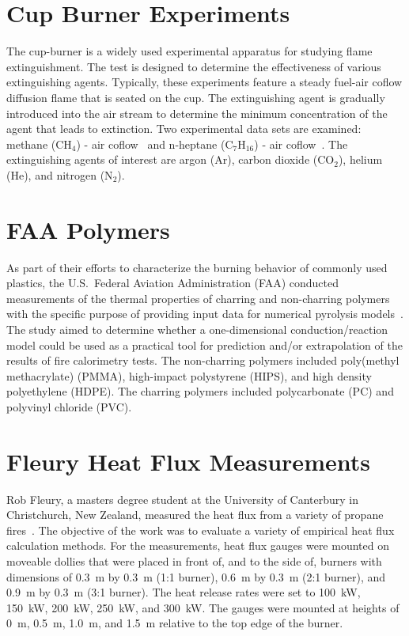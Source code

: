 \section{Cup Burner Experiments}

The cup-burner is a widely used experimental apparatus for studying flame extinguishment. The test is designed to determine the effectiveness of various extinguishing agents. Typically, these experiments feature a steady fuel-air coflow diffusion flame that is seated on the cup. The extinguishing agent is gradually introduced into the air stream to determine the minimum concentration of the agent that leads to extinction. Two experimental data sets are examined: methane (CH$_4$) - air coflow~\cite{Takahashi:2007} and n-heptane (C$_7$H$_{16}$) - air coflow~\cite{Moore:1996}. The extinguishing agents of interest are argon (Ar), carbon dioxide (CO$_2$), helium (He), and nitrogen (N$_2$).


\section{FAA Polymers}

As part of their efforts to characterize the burning behavior of commonly used plastics, the U.S.~Federal Aviation Administration (FAA) conducted measurements of the thermal properties of
charring and non-charring polymers with the specific purpose of providing input data for numerical pyrolysis models~\cite{Stoliarov:CF2009,Stoliarov:CF2010}.
The study aimed to determine whether a one-dimensional conduction/reaction model could be used
as a practical tool for prediction and/or extrapolation of the results of fire calorimetry tests. The non-charring polymers included poly(methyl methacrylate) (PMMA),
high-impact polystyrene (HIPS), and high density
polyethylene (HDPE). The charring polymers included polycarbonate (PC) and polyvinyl chloride (PVC).


\section{Fleury Heat Flux Measurements}

Rob Fleury, a masters degree student at the University of Canterbury in Christchurch, New Zealand, measured the heat flux from a variety of propane fires~\cite{Fleury:Masters}.
The objective of the work was to evaluate a variety of empirical heat flux calculation methods. For the measurements, heat flux gauges were mounted on moveable dollies that
were placed in front of, and to the side of, burners with dimensions of 0.3~m by 0.3~m (1:1 burner), 0.6~m by 0.3~m (2:1 burner), and 0.9~m by 0.3~m (3:1 burner). The heat release
rates were set to 100~kW, 150~kW, 200~kW, 250~kW, and 300~kW. The gauges were mounted at heights of 0~m, 0.5~m, 1.0~m, and 1.5~m relative to the top edge of the burner.

